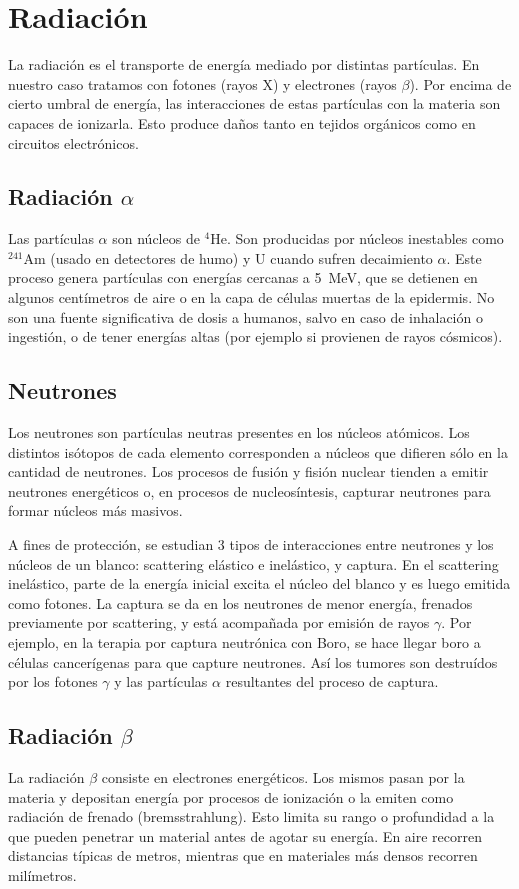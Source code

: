 \section{Radiación}
\label{sec:radiacion}
La radiación es el transporte de energía mediado por distintas partículas.
En nuestro caso tratamos con fotones (rayos X) y electrones (rayos $\beta$).
Por encima de cierto umbral de energía, 
las interacciones de estas partículas con la materia
son capaces de ionizarla.
Esto produce daños tanto en tejidos orgánicos como en circuitos electrónicos.
%
\subsection{Radiación $\alpha$}
Las partículas $\alpha$ son núcleos de $^4$He.
Son producidas por núcleos inestables como
$^{241}$Am (usado en detectores de humo) y U 
cuando sufren decaimiento $\alpha$.
Este proceso genera partículas con energías cercanas a 
\SI{5}{\mega\electronvolt},
que se detienen en algunos centímetros de aire 
o en la capa de células muertas de la epidermis.
No son una fuente significativa de dosis a humanos,
salvo en caso de inhalación o ingestión,
o de tener energías altas
(por ejemplo si provienen de rayos cósmicos).
\subsection{Neutrones}
Los neutrones son partículas neutras presentes en los núcleos atómicos.
Los distintos isótopos de cada elemento corresponden a núcleos que difieren
sólo en la cantidad de neutrones.
Los procesos de fusión y fisión nuclear 
tienden a emitir neutrones energéticos o,
en procesos de nucleosíntesis,
capturar neutrones para formar núcleos más masivos.

A fines de protección, se estudian 3 tipos de interacciones entre neutrones
y los núcleos de un blanco:
scattering elástico e inelástico, y captura.
En el scattering inelástico,
parte de la energía inicial excita el núcleo del blanco y es luego emitida como
fotones.
La captura se da en los neutrones de menor energía,
frenados previamente por scattering,
y está acompañada por emisión de rayos $\gamma$.
Por ejemplo, en la terapia por captura neutrónica con Boro,
se hace llegar boro a células cancerígenas para que capture neutrones.
Así los tumores son destruídos por los fotones $\gamma$ y las partículas 
$\alpha$ resultantes del proceso de captura.
\subsection{Radiación $\beta$}
La radiación $\beta$ consiste en electrones energéticos.
Los mismos pasan por la materia y depositan energía por procesos de ionización 
o la emiten como radiación de frenado (bremsstrahlung).
Esto limita su rango o profundidad a la que pueden penetrar un material antes
de agotar su energía.
En aire recorren distancias típicas de metros, 
mientras que en materiales más densos recorren milímetros.

